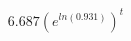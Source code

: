 \documentclass[preview]{standalone}
\begin{document}
\begin{align*}
6.687(e^{ln(0.931)})^t
\end{align*}
\end{document}
